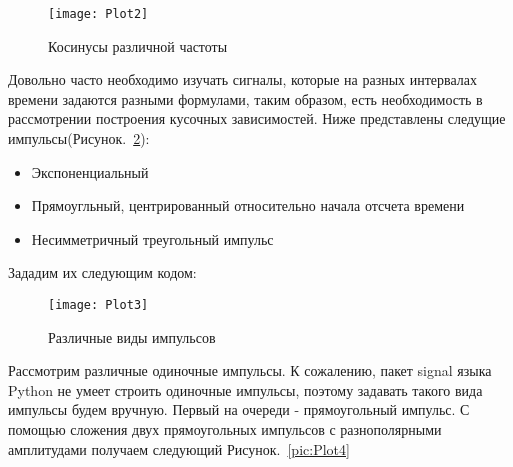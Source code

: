 
\parindent=1cm %

\begin{figure}[H]
	\begin{center}
		\texttt{[image: Plot2]}
		\caption{Косинусы различной частоты} 
		\label{pic:Plot2} %
	\end{center}
\end{figure}

Довольно часто необходимо изучать сигналы, которые на разных интервалах времени задаются разными формулами, таким образом, есть необходимость в  рассмотрении построения кусочных зависимостей. Ниже представлены следущие импульсы(Рисунок.~\ref{pic:Plot3}):
\begin{itemize}
\item Экспоненциальный
\item Прямоугльный, центрированный относительно начала отсчета времени
\item Несимметричный треугольный импульс
\end{itemize}

Зададим их следующим кодом:


\parindent=1cm %

\begin{figure}[H]
	\begin{center}
		\texttt{[image: Plot3]}
		\caption{Различные виды импульсов} 
		\label{pic:Plot3} %
	\end{center}
\end{figure}

Рассмотрим различные одиночные импульсы. К сожалению, пакет signal языка Python не умеет строить одиночные импульсы, поэтому задавать такого вида импульсы будем вручную. Первый на очереди - прямоугольный импульс. С помощью сложения двух прямоугольных импульсов с разнополярными амплитудами получаем следующий Рисунок.~\ref{pic:Plot4}



\parindent=1cm %

